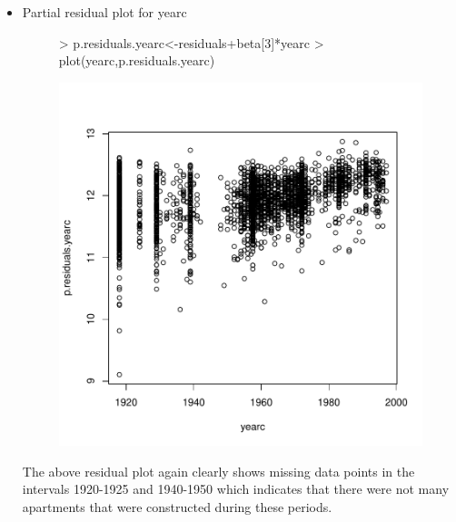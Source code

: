 \documentclass[12pt]{article}
\begin{document}
\begin{itemize}
\item Partial residual plot for yearc
\begin{figure}[H]
\begin{Schunk}
\begin{Sinput}
> p.residuals.yearc<-residuals+beta[3]*yearc
> plot(yearc,p.residuals.yearc)
\end{Sinput}
\end{Schunk}
\includegraphics{HW3-041}
\end{figure}
\clearpage

The above residual plot again clearly shows missing data points in the intervals 1920-1925 and 1940-1950 which indicates that there were not many apartments that were constructed during these periods. 


\end{itemize}
\end{document}
